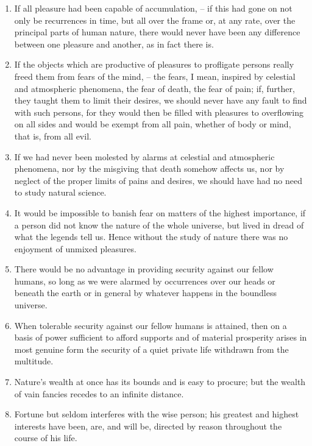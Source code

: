 \documentclass[12pt]{article}
\begin{document}
\begin{enumerate}[leftmargin=.5cm]
	\item If all pleasure had been capable of accumulation, -- if this had gone on not only be recurrences in time, but all over the frame or, at any rate, over the principal parts of human nature, there would never have been any difference between one pleasure and another, as in fact there is.

	\item If the objects which are productive of pleasures to profligate persons really freed them from fears of the mind, -- the fears, I mean, inspired by celestial and atmospheric phenomena, the fear of death, the fear of pain; if, further, they taught them to limit their desires, we should never have any fault to find with such persons, for they would then be filled with pleasures to overflowing on all sides and would be exempt from all pain, whether of body or mind, that is, from all evil. 

	\item If we had never been molested by alarms at celestial and atmospheric phenomena, nor by the misgiving that death somehow affects us, nor by neglect of the proper limits of pains and desires, we should have had no need to study natural science. 

	\item It would be impossible to banish fear on matters of the highest importance, if a person did not know the nature of the whole universe, but lived in dread of what the legends tell us. Hence without the study of nature there was no enjoyment of unmixed pleasures. 

	\item There would be no advantage in providing security against our fellow humans, so long as we were alarmed by occurrences over our heads or beneath the earth or in general by whatever happens in the boundless universe. 

	\item When tolerable security against our fellow humans is attained, then on a basis of power sufficient to afford supports and of material prosperity arises in most genuine form the security of a quiet private life withdrawn from the multitude. 

	\item Nature's wealth at once has its bounds and is easy to procure; but the wealth of vain fancies recedes to an infinite distance. 

	\item Fortune but seldom interferes with the wise person; his greatest and highest interests have been, are, and will be, directed by reason throughout the course of his life. 


\end{enumerate}
\end{document}
